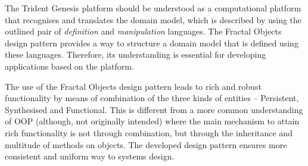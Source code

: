   The Trident Genesis platform should be understood as a computational platform that recognises and translates the domain model, which is described by using the outlined pair of \emph{definition} and \emph{manipulation} languages.
  The Fractal Objects design pattern provides a way to structure a domain model that is defined using these languages.
  Therefore, its understanding is essential for developing applications based on the platform.
  
  The use of the Fractal Objects design pattern leads to rich and robust functionality by means of combination of the three kinds of entities -- Persistent, Synthesised and Functional.
  This is different from a more common understanding of OOP (although, not originally intended) where the main mechanism to attain rich functionality is not through combination, but through the inheritance and multitude of methods on objects.
  The developed design pattern ensures more consistent and uniform way to systems design.
  
  